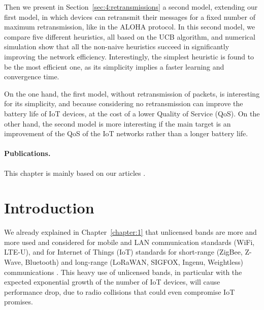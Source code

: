 Then we present in Section~\ref{sec:4:retransmissions} a second model, extending our first model, in which devices can retransmit their messages for a fixed number of maximum retransmission, like in the ALOHA protocol.
In this second model, we compare five different heuristics, all based on the UCB algorithm, and numerical simulation show that all the non-naive heuristics succeed in significantly improving the network efficiency.
Interestingly, the simplest heuristic is found to be the most efficient one, as its simplicity implies a faster learning and convergence time.

On the one hand, the first model, without retransmission of packets, is interesting for its simplicity, and because considering no retransmission can improve the battery life of IoT devices, at the cost of a lower Quality of Service (QoS).
On the other hand, the second model is more interesting if the main target is an improvement of the QoS of the IoT networks rather than a longer battery life.


\vfill{}

\paragraph{Publications.}

This chapter is mainly based on our articles \cite{Bonnefoi17,Besson2018ICT,Besson2019WCNC,Bonnefoi2019WCNC}.

\newpage


\section{Introduction}
\label{sec:4:motivations}

We already explained in Chapter~\ref{chapter:1} that
unlicensed bands are more and more used and considered for mobile and LAN communication standards (WiFi, LTE-U), and for Internet of Things (IoT) standards for short-range (ZigBee, Z-Wave, Bluetooth) and long-range (LoRaWAN, SIGFOX, Ingenu, Weightless) communications \cite{Centenaro16}.
This heavy use of unlicensed bands, in particular with the expected exponential growth of the number of IoT devices, will cause performance drop, due to radio collisions that could even compromise IoT promises.

